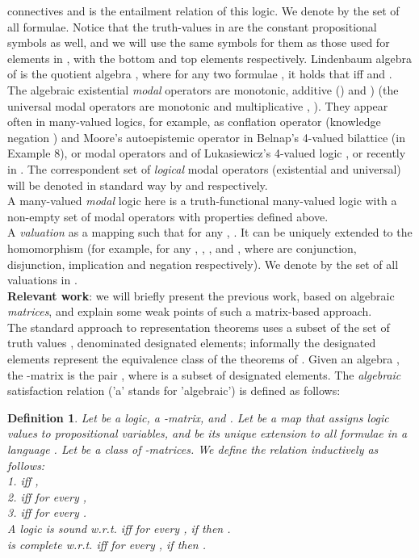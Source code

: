 \documentclass[10pt,twocolumn]{article}
\newtheorem{definition}{Definition}
\begin{document}
connectives and  is the entailment relation of this logic.
We denote by  the set of all formulae. Notice that the
 truth-values in  are the constant propositional symbols  as well, and we will use the same symbols for them as those
used for elements in , with the bottom and top elements 
respectively. Lindenbaum algebra of  is the quotient algebra
, where for any two formulae ,
it holds that  iff  and
.\\
The   algebraic existential \emph{modal}
operators  are monotonic,
additive ()
 and ) (the universal modal operators are monotonic and  multiplicative ,
  ).
  They appear often in many-valued logics, for example,
  as conflation operator (knowledge negation \cite{Fitt91})  and Moore's autoepistemic operator \cite{Gins90} in Belnap's 4-valued bilattice \cite{Beln77} (in Example 8),
  or modal operators  and  of Lukasiewicz's 4-valued logic \cite{Luka53,Luka57,MaPr09}, or recently in \cite{GeJo94,Dunn95,DuZh05,Rest05}. The correspondent set of \emph{logical}
modal operators (existential and universal) will be denoted in
  standard way by  and  respectively.\\
A many-valued \emph{modal} logic here is a truth-functional many-valued logic with
 a non-empty set of  modal operators with properties defined
 above. \\
 A  \emph{valuation}  as a mapping   such that for any , .
It can be uniquely extended to the homomorphism  (for example,
 for any , ,
 ,  and , where
  are conjunction, disjunction, implication and negation respectively). We denote by  the set of all   valuations in .\\
\textbf{Relevant work}: we will briefly present the previous work,
based on
algebraic \emph{matrices}, and explain some weak points of such a matrix-based approach.\\
  The standard approach to representation
theorems uses a subset  of the set of truth values ,
denominated designated elements; informally the
designated elements represent the equivalence class of the theorems
of . Given an algebra , the
-matrix is the pair , where  is a
subset of designated elements. The \emph{algebraic} satisfaction
relation  ('a' stands for 'algebraic') is defined as
follows:
\begin{definition} \label{def:matr} Let  be a logic,  a -matrix, and . Let  be a map that assigns logic values
to propositional variables, and 
be its unique extension to all formulae in a language . Let 
be a class of -matrices. We  define  the relation 
inductively as
follows:\\
1.  iff ,\\
2.  iff  for every ,\\
3.  iff 
for every .\\
A logic  is sound w.r.t.  iff for every ,
if  then .\\
 is complete w.r.t.  iff for every  , if
 then .
\end{definition}
\end{document}
